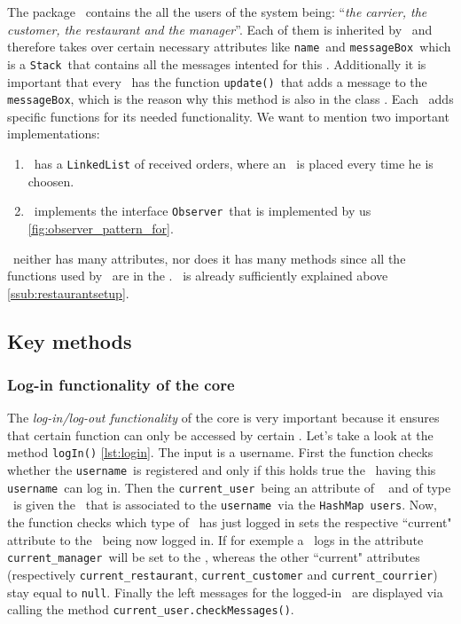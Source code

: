 The package \users~contains the all the users of the system being: ``\textit{the carrier, the customer, the restaurant and the manager}''.
Each of them is inherited by \User~and therefore takes over certain necessary attributes like \lstinline|name|~and \lstinline|messageBox|~which is a \lstinline|Stack|~that contains all the messages intented for this \User. Additionally it is important that every \User~has the function \lstinline|update()|~that adds a message to the \lstinline|messageBox|, which is the reason why this method is also in the class \User. Each \User~adds specific functions for its needed functionality. We want to mention two important implementations:

\begin{enumerate}
	\item \Courier~has a \lstinline|LinkedList| of received orders, where an \Order~is placed every time he is choosen.
	\item \Customer~implements the interface \lstinline|Observer|~that is implemented by us \ref{fig:observer_pattern_for}.
\end{enumerate}

\Manager~neither has many attributes, nor does it has many methods since all the functions used by \Manager~are in the \Core.
\Restaurant~is already sufficiently explained above \ref{ssub:restaurantsetup}.


\subsection{Key methods} %
\label{sub:key_methods}


\subsubsection{Log-in functionality of the core} %
\label{ssub:log_in_functionality_of_the_core}

The \emph{log-in/log-out functionality} of the core is very important because it ensures that certain function can only be accessed by certain \User. Let's take a look at the method \lstinline|logIn()| \ref{lst:login}. The input is a username. First the function checks whether the \lstinline|username|~is registered and only if this holds true the \User~having this \lstinline|username|~can log in. Then the \lstinline|current_user|~being an attribute of \Core~ and of type \User~is given the \User~that is associated to the \lstinline|username|~via the \lstinline|HashMap|~\lstinline|users|. Now, the function checks which type of \User~has just logged in sets the respective ``current" attribute to the \User~being now logged in. If for exemple a \Manager~logs in the attribute \lstinline|current_manager|~will be set to the \User, whereas the other ``current" attributes (respectively \lstinline|current_restaurant|, \lstinline|current_customer| and \lstinline|current_courrier|) stay equal to \lstinline|null|. Finally the left messages for the logged-in \User~are displayed via calling the method \lstinline|current_user.checkMessages()|.

